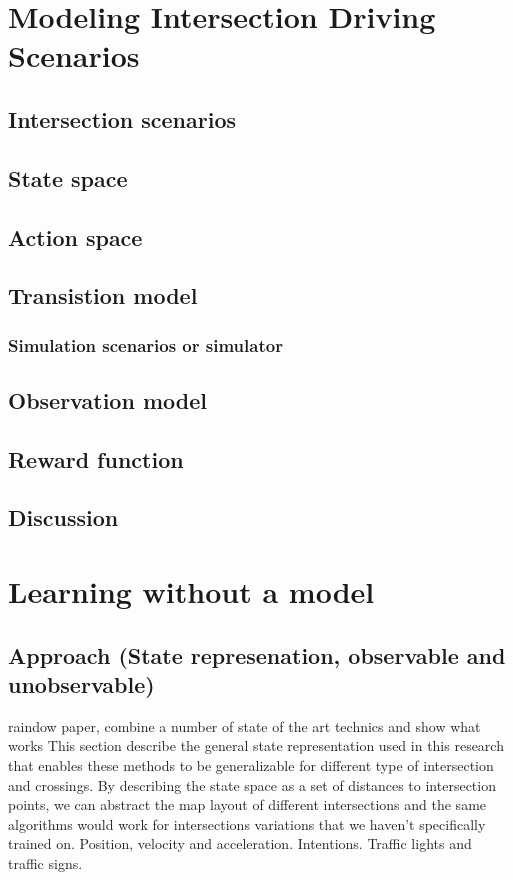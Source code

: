 \chapter{Modeling Intersection Driving Scenarios}
\section{Intersection scenarios}
\section{State space}
\section{Action space}
\section{Transistion model}
\subsection{Simulation scenarios or simulator}
\section{Observation model}
\section{Reward function}
\section{Discussion}




\chapter{Learning without a model}
\section{Approach (State represenation, observable and unobservable)}
raindow paper, combine a number of state of the art technics and show what works 
This section describe the general state representation used in this research that enables these methods to be generalizable for different type of intersection and crossings. 
By describing the state space as a set of distances to intersection points, we can abstract the map layout of different intersections and the same algorithms would work for intersections variations that we haven't specifically trained on. 
Position, velocity and acceleration. 
Intentions. Traffic lights and traffic signs. 
